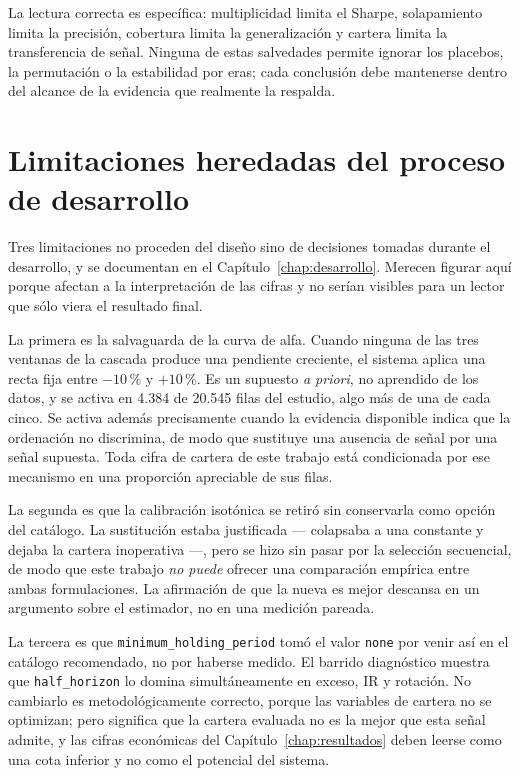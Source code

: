 La lectura correcta es específica: multiplicidad limita el Sharpe, solapamiento limita la precisión,
cobertura limita la generalización y cartera limita la transferencia de señal. Ninguna de estas
salvedades permite ignorar los placebos, la permutación o la estabilidad por eras; cada conclusión
debe mantenerse dentro del alcance de la evidencia que realmente la respalda.

\section{Limitaciones heredadas del proceso de desarrollo}

Tres limitaciones no proceden del diseño sino de decisiones tomadas durante el desarrollo, y se
documentan en el Capítulo~\ref{chap:desarrollo}. Merecen figurar aquí porque afectan a la
interpretación de las cifras y no serían visibles para un lector que sólo viera el resultado final.

La primera es la salvaguarda de la curva de alfa. Cuando ninguna de las tres ventanas de la cascada
produce una pendiente creciente, el sistema aplica una recta fija entre $-10\,\%$ y $+10\,\%$. Es un
supuesto \emph{a priori}, no aprendido de los datos, y se activa en 4.384 de 20.545 filas del
estudio, algo más de una de cada cinco. Se activa además precisamente cuando la evidencia disponible
indica que la ordenación no discrimina, de modo que sustituye una ausencia de señal por una señal
supuesta. Toda cifra de cartera de este trabajo está condicionada por ese mecanismo en una
proporción apreciable de sus filas.

La segunda es que la calibración isotónica se retiró sin conservarla como opción del catálogo. La
sustitución estaba justificada --- colapsaba a una constante y dejaba la cartera inoperativa ---,
pero se hizo sin pasar por la selección secuencial, de modo que este trabajo \emph{no puede} ofrecer
una comparación empírica entre ambas formulaciones. La afirmación de que la nueva es mejor descansa
en un argumento sobre el estimador, no en una medición pareada.

La tercera es que \texttt{minimum\_holding\_period} tomó el valor \texttt{none} por venir así en el
catálogo recomendado, no por haberse medido. El barrido diagnóstico muestra que
\texttt{half\_horizon} lo domina simultáneamente en exceso, IR y rotación. No cambiarlo es
metodológicamente correcto, porque las variables de cartera no se optimizan; pero significa que la
cartera evaluada no es la mejor que esta señal admite, y las cifras económicas del
Capítulo~\ref{chap:resultados} deben leerse como una cota inferior y no como el potencial del
sistema.


